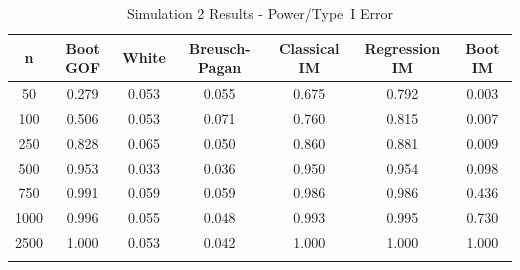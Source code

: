 \documentclass[sn-mathphys-ay]{sn-jnl}
\begin{document}

\begin{table}[h]
\caption{Simulation 2 Results - Power/Type~I Error}\label{sim2tab}%
\begin{tabular}{ c|c|c|c|c|c|c}
\toprule
n & Boot GOF & White & Breusch-Pagan & Classical IM & Regression IM & Boot IM \\
\midrule
50 & 0.279 & 0.053 & 0.055 & 0.675 & 0.792 & 0.003 \\
100 & 0.506 & 0.053 & 0.071 & 0.760 & 0.815 & 0.007 \\
250 & 0.828 & 0.065 & 0.050 & 0.860 & 0.881 & 0.009 \\
500 & 0.953 & 0.033 & 0.036 & 0.950 & 0.954 & 0.098 \\
750 & 0.991 & 0.059 & 0.059 & 0.986 & 0.986 & 0.436 \\
1000 & 0.996 & 0.055 & 0.048 & 0.993 & 0.995 & 0.730 \\
2500 & 1.000 & 0.053 & 0.042 & 1.000 & 1.000 & 1.000 \\
\botrule
\end{tabular}

\end{table}
\end{document}
